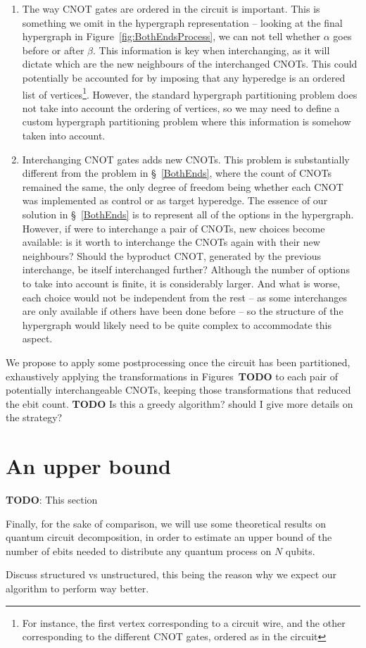 \begin{enumerate}
  \item The way CNOT gates are ordered in the circuit is important. This is something we omit in the hypergraph representation -- looking at the final hypergraph in Figure~\ref{fig:BothEndsProcess}, we can not tell whether \(\alpha\) goes before or after \(\beta\). This information is key when interchanging, as it will dictate which are the new neighbours of the interchanged CNOTs. This could potentially be accounted for by imposing that any hyperedge is an ordered list of vertices\footnote{For instance, the first vertex corresponding to a circuit wire, and the other corresponding to the different CNOT gates, ordered as in the circuit}. However, the standard hypergraph partitioning problem does not take into account the ordering of vertices, so we may need to define a custom hypergraph partitioning problem where this information is somehow taken into account.
  \item Interchanging CNOT gates adds new CNOTs. This problem is substantially different from the problem in \S~\ref{BothEnds}, where the count of CNOTs remained the same, the only degree of freedom being whether each CNOT was implemented as control or as target hyperedge. The essence of our solution in \S~\ref{BothEnds} is to represent all of the options in the hypergraph. However, if were to interchange a pair of CNOTs, new choices become available: is it worth to interchange the CNOTs again with their new neighbours? Should the byproduct CNOT, generated by the previous interchange, be itself interchanged further? Although the number of options to take into account is finite, it is considerably larger. And what is worse, each choice would not be independent from the rest -- as some interchanges are only available if others have been done before -- so the structure of the hypergraph would likely need to be quite complex to accommodate this aspect.
\end{enumerate}

We propose to apply some postprocessing once the circuit has been partitioned, exhaustively applying the transformations in Figures~\textbf{TODO} to each pair of potentially interchangeable CNOTs, keeping those transformations that reduced the ebit count. \textbf{TODO} Is this a greedy algorithm? should I give more details on the strategy?

\section{An upper bound}

\textbf{TODO}: This section

Finally, for the sake of comparison, we will use some theoretical results on quantum circuit decomposition, in order to estimate an upper bound of the number of ebits needed to distribute any quantum process on \(N\) qubits.

Discuss structured vs unstructured, this being the reason why we expect our algorithm to perform way better.
